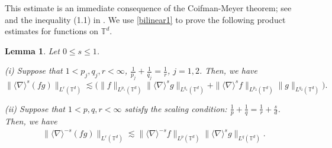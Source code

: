 \documentclass[letterpaper, 11pt,  reqno]{amsart}
\newtheorem{lemma}[theorem]{Lemma}
\newcommand{\1}{\hspace{0.5mm}\text{I}\hspace{0.5mm}}
\newcommand{\noi}{\noindent}
\newcommand{\T}{\mathbb{T}}
\newcommand{\nb}{\nabla}
\newcommand{\les}{\lesssim}
\newcommand{\jb}[1]
{\langle #1 \rangle}
\numberwithin{equation}{section}
\numberwithin{theorem}{section}
\begin{document}
\noi
This estimate is an immediate consequence of 
 the Coifman-Meyer theorem; see \cite{CM} and the inequality (1.1) in \cite{MS}.    
We use \eqref{bilinear1} to prove  the following product estimates
for functions on $\T^d$.


\begin{lemma}\label{LEM:bilin}
 Let $0\le s \le 1$.

\smallskip

\noi
\textup{(i)} Suppose that 
 $1<p_j,q_j,r < \infty$, $\frac1{p_j} + \frac1{q_j}= \frac1r$, $j = 1, 2$. 
 Then, we have  
\begin{equation}  
\| \jb{\nb}^s (fg) \|_{L^r(\T^d)} 
\les \Big( \| f \|_{L^{p_1}(\T^d)} 
\| \jb{\nb}^s g \|_{L^{q_1}(\T^d)} + \| \jb{\nb}^s f \|_{L^{p_2}(\T^d)} 
\|  g \|_{L^{q_2}(\T^d)}\Big).
\label{bilinear5}
\end{equation}  


\smallskip

\noi
\textup{(ii)} 
Suppose that  
 $1<p,q,r < \infty$ satisfy the scaling condition:
$\frac1p+\frac1q=\frac1r + \frac{s}d $.
Then, we have
\begin{align}
\big\| \jb{\nb}^{-s} (fg) \big\|_{L^r(\T^d)} \les \big\| \jb{\nb}^{-s} f \big\|_{L^p(\T^d) } 
\big\| \jb{\nb}^s g \big\|_{L^q(\T^d)}.  
\label{bilinear2}
\end{align}


\end{lemma} 
\end{document}
